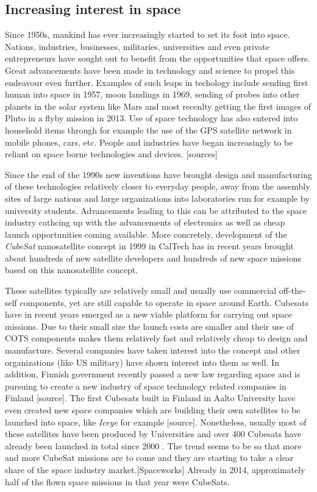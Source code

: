 \documentclass[english,12pt,a4paper,pdftex,elec,utf8]{aaltothesis}
\begin{document}
\subsection{Increasing interest in space}
Since 1950s, mankind has ever increasingly started to set its foot into space. Nations, industries, businesses, militaries, universities and even private entrepreneurs have sought out to benefit from the opportunities that space offers. Great advancements have been made in technology and science to propel this endeavour even further. Examples of such leaps in techology include sending first human into space in 1957, moon landings in 1969, sending of probes into other planets in the solar system like Mars and most recenlty getting the first images of Pluto in a flyby mission in 2013. Use of space technology has also entered into household items through for example the use of the GPS satellite network in mobile phones, cars, etc. People and industries have began increasingly to be reliant on space borne technologies and devices. [sources]\par
Since the end of the 1990s new inventions have brought design and manufacturing of these technologies relatively closer to everyday people, away from the assembly sites of large nations and large organizations into laboratories run for example by university students. Advancements leading to this can be attributed to the space industry cathcing up with the advancements of electronics as well as cheap launch opportunities coming available. More concretely, development of the \textit{CubeSat} nanosatellite concept in 1999 in CalTech has in recent years brought about hundreds of new satellite developers and hundreds of new space missions based on this nanosatellite concept. \cite{Swart1, Swart2016}\par 
These satellites typically are relatively small and usually use commercial off-the-self components, yet are still capable to operate in space around Earth. Cubesats have in recent years emerged as a new viable platform for carrying out space missions. Due to their small size the launch costs are smaller and their use of COTS components makes them relatively fast and relatively cheap to design and manufacture.  Several companies have taken interest into the concept and other organizations (like US military) have shown interest into them as well. In addition, Finnish government recently passed a new law regarding space and is pursuing to create a new industry of space technology related companies in Finland [source]. The first Cubesats built in Finland in Aalto University have even created new space companies which are building their own satellites to be launched into space, like \textit{Iceye} for example  [source]. Nonetheless, usually most of these satellites have been produced by Universities and over 400 Cubesats have already been launched in total since 2000 \cite{Swart2016}. The trend seems to be so that more and more CubeSat missions are to come and they are starting to take a clear share of the space industry market.[Spaceworks] Already in 2014, approximately half of the flown space missions in that year were CubeSats. \cite{Swart2016}\par 
\end{document}
